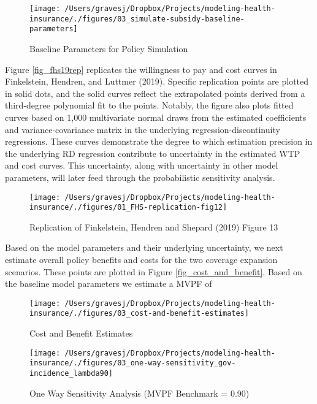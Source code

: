 \documentclass[
  10pt,
]{article}
\begin{document}
\begin{figure}
\texttt{[image: /Users/gravesj/Dropbox/Projects/modeling-health-insurance/./figures/03\_simulate-subsidy-baseline-parameters]} \caption{\label{table_params}Baseline Parameters for Policy Simulation}\label{fig:unnamed-chunk-2}
\end{figure}

Figure \ref{fig_fhs19rep} replicates the willingness to pay and cost
curves in Finkelstein, Hendren, and Luttmer (2019). Specific replication
points are plotted in solid dots, and the solid curves reflect the
extrapolated points derived from a third-degree polynomial fit to the
points. Notably, the figure also plots fitted curves based on 1,000
multivariate normal draws from the estimated coefficients and
variance-covariance matrix in the underlying regression-discontinuity
regressions. These curves demonstrate the degree to which estimation
precision in the underlying RD regression contribute to uncertainty in
the estimated WTP and cost curves. This uncertainty, along with
uncertainty in other model parameters, will later feed through the
probabilistic sensitivity analysis.

\begin{figure}
\texttt{[image: /Users/gravesj/Dropbox/Projects/modeling-health-insurance/./figures/01\_FHS-replication-fig12]} \caption{\label{fig_fhs19rep}Replication of Finkelstein, Hendren and Shepard (2019) Figure 13}\label{fig:unnamed-chunk-3}
\end{figure}

Based on the model parameters and their underlying uncertainty, we next
estimate overall policy benefits and costs for the two coverage
expansion scenarios. These points are plotted in Figure
\ref{fig_cost_and_benefit}. Based on the baseline model parameters we
estimate a MVPF of

\newpage
\begin{figure}
\texttt{[image: /Users/gravesj/Dropbox/Projects/modeling-health-insurance/./figures/03\_cost-and-benefit-estimates]} \caption{\label{fig_cost_and_benefit}Cost and Benefit Estimates}\label{fig:unnamed-chunk-4}
\end{figure}

\newpage

\newpage

\begin{figure}
\texttt{[image: /Users/gravesj/Dropbox/Projects/modeling-health-insurance/./figures/03\_one-way-sensitivity\_gov-incidence\_lambda90]} \caption{\label{fig_oneway90}One Way Sensitivity Analysis (MVPF Benchmark = 0.90)}\label{fig:unnamed-chunk-5}
\end{figure}
\end{document}
